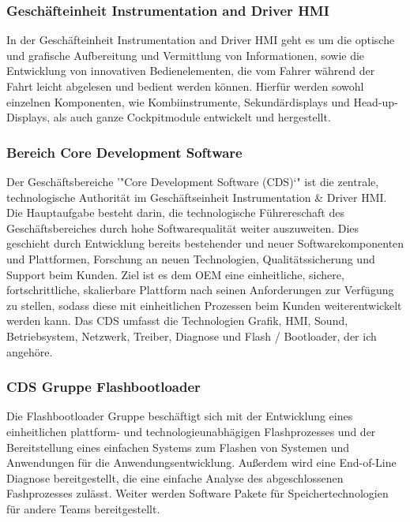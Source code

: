 

\subsubsection{Geschäfteinheit Instrumentation and Driver HMI}
In der Geschäfteinheit Instrumentation and Driver HMI geht es um die optische und grafische Aufbereitung und Vermittlung von Informationen, sowie die Entwicklung von innovativen Bedienelementen, die vom Fahrer während der Fahrt leicht abgelesen und bedient werden können. Hierfür werden sowohl einzelnen Komponenten, wie Kombiinstrumente, Sekundärdisplays und Head-up-Displays, als auch ganze Cockpitmodule entwickelt und hergestellt.

\subsubsection{Bereich Core Development Software}
Der Geschäftsbereiche '"Core Development Software (CDS)`" ist die zentrale, technologische Authorität im Geschäftseinheit Instrumentation \& Driver HMI. Die Hauptaufgabe besteht darin, die technologische Führereschaft des Geschäftsbereiches durch hohe Softwarequalität weiter auszuweiten. Dies geschieht durch Entwicklung bereits bestehender und neuer Softwarekomponenten und Plattformen, Forschung an neuen Technologien, Qualitätssicherung und Support beim Kunden.
Ziel ist es dem OEM eine einheitliche, sichere, fortschrittliche, skalierbare Plattform nach seinen Anforderungen zur Verfügung zu stellen, sodass diese mit einheitlichen Prozessen beim Kunden weiterentwickelt werden kann.
Das CDS umfasst die Technologien Grafik, HMI, Sound, Betriebsystem, Netzwerk, Treiber, Diagnose und Flash / Bootloader, der ich angehöre. 

\subsubsection{CDS Gruppe Flashbootloader} %
Die Flashbootloader Gruppe beschäftigt sich mit der Entwicklung eines einheitlichen plattform- und technologieunabhägigen Flashprozesses und der Bereitstellung eines einfachen Systems zum Flashen von Systemen und Anwendungen für die Anwendungsentwicklung. 
Außerdem wird eine End-of-Line Diagnose bereitgestellt, die eine einfache Analyse des abgeschlossenen Fashprozesses zulässt. 
Weiter werden Software Pakete für Speichertechnologien für andere Teams bereitgestellt. 


